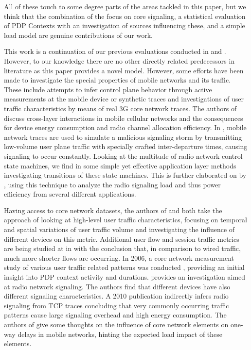 All of these touch to some degree parts of the areas tackled in this paper, but we think that the combination of the focus on core signaling, a statistical evaluation of PDP Contexts with an investigation of sources influencing these, and a simple load model are genuine contributions of our work.


This work is a continuation of our previous evaluations conducted in \cite{metzger2012research} and \cite{metzger2013}. However, to our knowledge there are no other directly related predecessors in literature as this paper provides a novel model. However, some efforts have been made to investigate the special properties of mobile networks and its traffic. These include attempts to infer control plane behavior through active measurements at the mobile device or synthetic traces and investigations of user traffic characteristics by means of real 3G core network traces.
The authors of \cite{qian2011profiling} discuss cross-layer interactions in mobile cellular networks and the consequences for device energy consumption and radio channel allocation efficiency. In \cite{lee2007detection}, mobile network traces are used to simulate a malicious signaling storm by transmitting low-volume user plane traffic with specially crafted inter-departure times, causing signaling to occur constantly. Looking at the multitude of radio network control state machines, we find in \cite{5360763} some simple yet effective application layer methods investigating transitions of these state machines. This is further elaborated on by \cite{schwartz2013angrybirds}, using this technique to analyze the radio signaling load and thus power efficiency from several different applications.

Having access to core network datasets, the authors of \cite{shafiq2011characterizing} and \cite{paul2011understanding} both take the approach of looking at high-level user traffic characteristics, focusing on temporal and spatial variations of user traffic volume and investigating the influence of different devices on this metric. Additional user flow and session traffic metrics are being studied at in \cite{Zhang:2012:UCC:2377677.2377764} with the conclusion that, in comparison to wired traffic, much more shorter flows are occurring. In 2006, a core network measurement study of various user traffic related patterns was conducted \cite{svoboda2006composition}, providing an initial insight into \gls{PDP} context activity and durations. \cite{he2012panoramic} provides an investigation aimed at radio network signaling. The authors find that different devices have also different signaling characteristics. A 2010 publication \cite{Qian:2010:CRR:1879141.1879159} indirectly infers radio signaling from TCP traces concluding that very commonly occurring traffic patterns cause large signaling overhead and high energy consumption. The authors of \cite{4675847} give some thoughts on the influence of core network elements on one-way delays in mobile networks, hinting the expected load impact of these elements.

